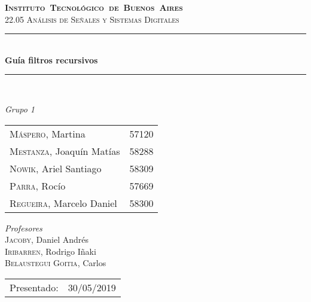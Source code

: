 \begin{titlepage}
\newcommand{\HRule}{\rule{\linewidth}{0.5mm}}
\center
\mbox{\textsc{\LARGE \bfseries {Instituto Tecnológico de Buenos Aires}}}\\[1.5cm]
\textsc{\Large 22.05 Análisis de Señales y Sistemas Digitales}\\[0.5cm]


\HRule \\[0.6cm]
{ \Huge \bfseries Guía filtros recursivos}\\[0.4cm] %
\HRule \\[1.5cm]


{\large

\emph{Grupo 1}\\
\vspace{3px}

\begin{tabular}{lr} 	
\textsc{Máspero}, Martina  & 57120 \\
\textsc{Mestanza}, Joaqu\'in Mat\'ias  & 58288 \\
\textsc{Nowik}, Ariel Santiago  & 58309 \\
\textsc{Parra}, Roc\'io  & 57669 \\
\textsc{Regueira}, Marcelo Daniel  & 58300 \\
\end{tabular}

\vspace{20px}

\emph{Profesores}\\
\vspace{3px}
\textsc{Jacoby}, Daniel Andr\'es\\ 	
\textsc{Iribarren}, Rodrigo I\~naki\\ 	
\textsc{Belaustegui Goitia}, Carlos\\ 	

\vspace{100px}

\begin{tabular}{ll}

Presentado: & 30/05/2019\\

\end{tabular}

}

\vfill

\end{titlepage}